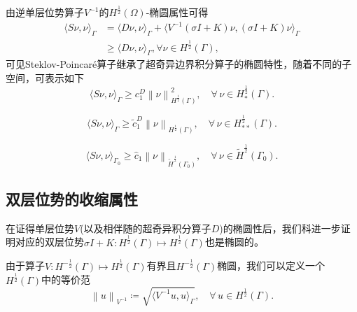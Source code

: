 由逆单层位势算子$V^{-1}$的$H^{\frac{1}{2}}(\Omega)$-椭圆属性可得
\begin{equation}
  \label{eq:bvp-bie-spo-ellipticity}
  \begin{split}
    \langle S \nu, \nu \rangle_{\Gamma}
    &= \langle D \nu, \nu \rangle_{\Gamma}
    + \langle V^{-1} \left( \sigma I + K \right) \nu,
    \left(\sigma I + K \right) \nu \rangle_{\Gamma} \\
    & \ge \langle D \nu, \nu \rangle_{\Gamma}, \forall \nu \in H^{\frac{1}{2}}(\Gamma),
  \end{split}
\end{equation}
可见Steklov-Poincaré算子继承了超奇异边界积分算子的椭圆特性，随着不同的子空间，可表示如下
\begin{equation}
  \label{eq:bvp-bie-spo-ellipticity-subspace-star}
  \langle S \nu, \nu \rangle_{\Gamma} \ge c_{1}^{D} \left\| \nu \right\|_{H^{\frac{1}{2}}(\Gamma)}^{2}, \quad \forall \, \nu \in H_{*}^{\frac{1}{2}}(\Gamma).
\end{equation}

\begin{equation}
  \label{eq:bvp-bie-spo-ellipticity-subspace-starstar}
  \langle S \nu, \nu \rangle_{\Gamma} \ge \widetilde{c}_{1}^{D}
  \left\| \nu \right\|_{H^{\frac{1}{2}}(\Gamma)}, \quad \forall \, \nu \in H_{**}^{\frac{1}{2}}(\Gamma).
\end{equation}

\begin{equation}
    \label{eq:bvp-bie-spo-ellipticity-subspace-gamma0}
    \langle S \nu, \nu \rangle_{\Gamma_{0}} \ge \hat{c}_{1} \left\|
    \nu \right\|_{\widetilde{H}^{\frac{1}{2}}(\Gamma_{0})}, \quad \forall \, \nu \in \widetilde{H}^{\frac{1}{2}}(\Gamma_{0}).
\end{equation}

\subsection{双层位势的收缩属性}
\label{sec:bvp-bie-double-layer-contraction}
在证得单层位势$V$(以及相伴随的超奇异积分算子$D$)的椭圆性后，我们科进一步证明对应的双层位势$\sigma I + K : H^{\frac{1}{2}}(\Gamma) \mapsto H^{\frac{1}{2}}(\Gamma)$也是椭圆的\citep{Steinbach:2001he}。

由于算子$V: H^{-\frac{1}{2}}(\Gamma) \mapsto H^{\frac{1}{2}}(\Gamma)$有界且$H^{-\frac{1}{2}}(\Gamma)$椭圆，我们可以定义一个$H^{\frac{1}{2}}(\Gamma)$中的等价范
\begin{equation}
  \label{eq:bvp-bie-unorm-vinverse}
  \left\| u \right\|_{V^{-1}} \coloneqq \sqrt{
  \langle V^{-1} u, u \rangle_{\Gamma}
  }, \quad \forall \, u \in H^{\frac{1}{2}}(\Gamma).
\end{equation}

